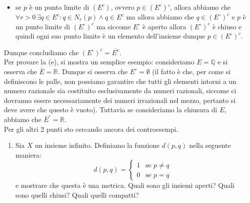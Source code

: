 \documentclass{report}
\begin{document}
\begin{mysolution}
\begin{itemize}
	\item se $p$ è un punto limite di $(E^c)$, ovvero $p \in (E^c)'$, allora abbiamo che $\forall r > 0 \, \exists q \in E^c: q \in N_r(p) \wedge q \in E^c$ ma allora abbiamo che $q \in (E^{\circ})^c$ e $p$ è un punto limite di $(E^{\circ})^c$ ma siccome $E^{\circ}$ è aperto allora $(E^{\circ})^c$ è chiuso e quindi ogni suo punto limite è un elemento dell'insieme dunque $p \in (E^{\circ})^c$.
\end{itemize}
Dunque concludiamo che $(E^{\circ})^c = \overline{E^c}$. \\
Per provare la (e), si mostra un semplice esempio: consideriamo $E = \mathbb{Q}$ e si osserva che $\bar{E} = \mathbb{R}$. Dunque si osserva che $E^{\circ} = \emptyset$ (il fatto è che, per come si definiscono le palle, non possiamo garantire che tutti gli elementi intorni a un numero razionale sia costituito esclusivamente da numeri razionali, siccome ci dovranno essere necessariamente dei numeri irrazionali nel mezzo, pertanto si deve avere che questo è vuoto). Tuttavia se consideriamo la chiusura di $E$, abbiamo che $\bar{E}^{\circ} = \mathbb{R}$. \\
Per gli altri 2 punti sto cercando ancora dei controesempi.
\end{mysolution}
\begin{enumerate}[resume, label=\protect\circled{\arabic*}]
	\item Sia $X$ un insieme infinito. Definiamo la funzione $d(p, q)$ nella seguente maniera:
	\begin{equation*}
		d(p, q) = \begin{cases}	1 & \text{se } p \neq q \\
		0 & \text{se } p = q	\end{cases}
	\end{equation*}
	e mostrare che questa è una metrica. Quali sono gli insiemi aperti? Quali sono quelli chiusi? Quali quelli compatti?
\end{enumerate}
\end{document}
